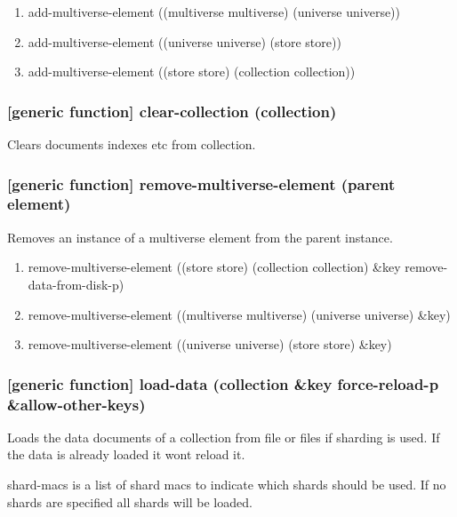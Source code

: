 \documentclass[11pt]{article}
\begin{document}
\begin{enumerate}
\item add-multiverse-element ((multiverse multiverse) (universe universe))
\label{sec:orgadb73c9}
\item add-multiverse-element ((universe universe) (store store))
\label{sec:org90ec73e}
\item add-multiverse-element ((store store) (collection collection))
\label{sec:org0f38d20}
\end{enumerate}

\subsubsection{[generic function] clear-collection (collection)}
\label{sec:orga70efe1}

Clears documents indexes etc from collection.

\subsubsection{[generic function] remove-multiverse-element (parent element)}
\label{sec:orgb085577}

Removes an instance of a multiverse element from the parent instance.

\begin{enumerate}
\item remove-multiverse-element ((store store) (collection collection) \&key remove-data-from-disk-p)
\label{sec:org5d6d6fd}
\item remove-multiverse-element ((multiverse multiverse) (universe universe) \&key)
\label{sec:orgc65be5a}
\item remove-multiverse-element ((universe universe) (store store) \&key)
\label{sec:org08f693a}
\end{enumerate}


\subsubsection{[generic function] load-data (collection \&key force-reload-p \&allow-other-keys)}
\label{sec:orgd506b59}

Loads the data documents of a collection from file or files if
sharding is used. If the data is already loaded it wont reload it.

shard-macs is a list of shard macs to indicate which shards should be
used. If no shards are specified all shards will be loaded.
\end{document}

